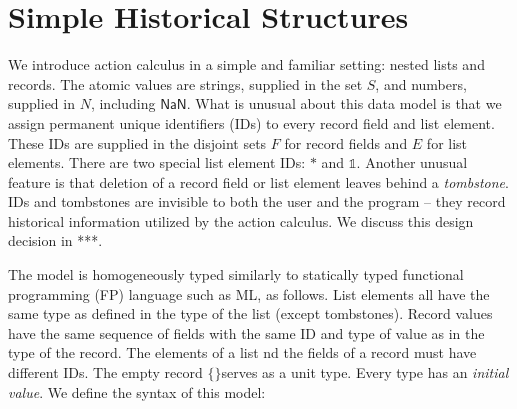 \documentclass[english,submission]{programming}
\newcommand{\mathbox}[1]{\colorbox{black!10}{$#1$}}
\newcommand{\emptystring}{\textsf{\textquotedbl\ \!\textquotedbl}}
\begin{document}
\section{Simple Historical Structures}

We introduce action calculus in a simple and familiar setting: nested lists and records. The atomic values are strings, supplied in the set \mathbox{S}, and numbers, supplied in \mathbox{N}, including \mathbox{\textsf{NaN}}. What is unusual about this data model is that we assign permanent unique identifiers (IDs) to every record field and list element. These IDs are supplied in the disjoint sets \mathbox{F} for record fields and \mathbox{E} for list elements. There are two special list element IDs: \mathbox{*} and \mathbox{\mathbb{1}}. Another unusual feature is that deletion of a record field or list element leaves behind a \textit{tombstone}. IDs and tombstones are invisible to both the user and the program -- they record historical information utilized by the action calculus. We discuss this design decision in ***.

The model is homogeneously typed similarly to statically typed functional programming (FP) language such as ML, as follows. List elements all have the same type as defined in the type of the list (except tombstones). Record values have the same sequence of fields with the same ID and type of value as in the type of the record. The elements of a list nd the fields of a record must have different IDs.
The empty record \mathbox{\text{\{\}}}serves as a unit type. Every type has an \textit{initial value}. We define the syntax of this model:

\tcbox{
\[ \begin{array}{rl|rl|rl|l}
  \multicolumn{2}{l|}{\textrm{type}} & \multicolumn{2}{l|}{\textrm{value}} & \multicolumn{2}{l|}{\textrm{initial value}}&\\
  \hline
  T \Coloneqq & & v \Coloneqq & & T^\varnothing = & &\\
  &  \textsf{String} & & S & & \emptystring & \textrm{string}\\
  & \textsf{Number} & &  N & & \textsf{NaN} & \textrm{number}\\
  & \textsf{List } T & & [ E : v \  \dots ] & & [] & \textrm{list}\\
  & \{ F : T \  \dots \} & & \{ F : v \  \dots \} & & \{ F : T^\varnothing \  \dots \}& \textrm{record}\\

  & \bot && \bigtimes & & \bigtimes & \textrm{tombstone}\\
\end{array}\]
}
\end{document}
